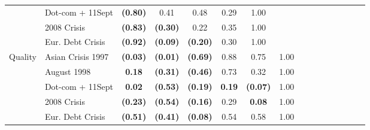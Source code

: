 \documentclass[12pt]{article}
\begin{document}
\begin{table}[H]
{\begin{tabular}{@{}llcccccccccccccc@{}}
                  & Dot-com + 11Sept  & \textbf{(0.80)} & 0.41            & 0.48            & 0.29            & 1.00            &                 &                 &                 &                 &                 &                 &                 &                 &                 \\
                  & 2008 Crisis       & \textbf{(0.83)} & \textbf{(0.30)} & 0.22            & 0.35            & 1.00            &                 &                 &                 &                 &                 &                 &                 &                 &                 \\
                  & Eur. Debt Crisis  & \textbf{(0.92)} & \textbf{(0.09)} & \textbf{(0.20)} & 0.30            & 1.00            &                 &                 &                 &                 &                 &                 &                 &                 &                 \\
Quality           & Asian Crisis 1997 & \textbf{(0.03)} & \textbf{(0.01)} & \textbf{(0.69)} & 0.88            & 0.75            & 1.00            & \textbf{}       & \textbf{}       &                 &                 &                 &                 &                 &                 \\
                  & August 1998       & \textbf{0.18}   & \textbf{(0.31)} & \textbf{(0.46)} & 0.73            & 0.32            & 1.00            &                 &                 &                 &                 &                 &                 &                 &                 \\
                  & Dot-com + 11Sept  & \textbf{0.02}   & \textbf{(0.53)} & \textbf{(0.19)} & \textbf{0.19}   & \textbf{(0.07)} & 1.00            &                 &                 &                 &                 &                 &                 &                 &                 \\
                  & 2008 Crisis       & \textbf{(0.23)} & \textbf{(0.54)} & \textbf{(0.16)} & 0.29            & \textbf{0.08}   & 1.00            &                 &                 &                 &                 &                 &                 &                 &                 \\
                  & Eur. Debt Crisis  & \textbf{(0.51)} & \textbf{(0.41)} & \textbf{(0.08)} & 0.54            & 0.58            & 1.00            &                 &                 &                 &                 &                 &                 &                 &                 \\

\end{tabular}}
\end{table}
\end{document}
